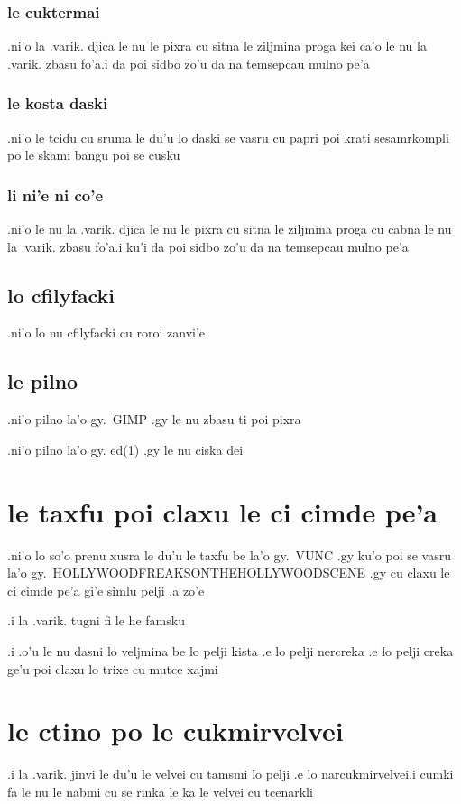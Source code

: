 \documentclass{report}
\begin{document}
\subsubsection{le cuktermai}
.ni'o la .varik. djica le nu le pixra cu sitna le ziljmina proga kei ca'o le nu la .varik. zbasu fo'a\@  .i da poi sidbo zo'u da na temsepcau mulno pe'a
\subsubsection{le kosta daski}
.ni'o le tcidu cu sruma le du'u lo daski se vasru cu papri poi krati sesamrkompli po le skami bangu poi se cusku
\subsubsection{li ni'e ni co'e}
.ni'o le nu la .varik. djica le nu le pixra cu sitna le ziljmina proga cu cabna le nu la .varik. zbasu fo'a\@  .i ku'i da poi sidbo zo'u da na temsepcau mulno pe'a
\subsection{lo cfilyfacki}
.ni'o lo nu cfilyfacki cu roroi zanvi'e
\subsection{le pilno}
.ni'o pilno la'o gy.\ GIMP .gy le nu zbasu ti poi pixra

.ni'o pilno la'o gy. ed(1) .gy le nu ciska dei
\section{le taxfu poi claxu le ci cimde pe'a}
.ni'o lo so'o prenu xusra le du'u le taxfu be la'o gy.\ VUNC .gy ku'o poi se vasru la'o gy.\ HOLLYWOODFREAKSONTHEHOLLYWOODSCENE .gy cu claxu le ci cimde pe'a gi'e simlu pelji .a zo'e

.i la .varik. tugni fi le he famsku

.i .o'u le nu dasni lo veljmina be lo pelji kista .e lo pelji nercreka .e lo pelji creka ge'u poi claxu lo trixe cu mutce xajmi
\section{le ctino po le cukmirvelvei}
.i la .varik. jinvi le du'u le velvei cu tamsmi lo pelji .e lo narcukmirvelvei\@  .i cumki fa le nu le nabmi cu se rinka le ka le velvei cu tcenarkli
\end{document}
